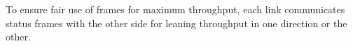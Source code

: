 \documentclass[../../../OAE-SPEC-MAIN.tex]{subfiles}
\begin{document}
To ensure fair use of frames for maximum throughput, each link communicates status frames with the other side for leaning throughput in one direction or the other.











\end{document}
